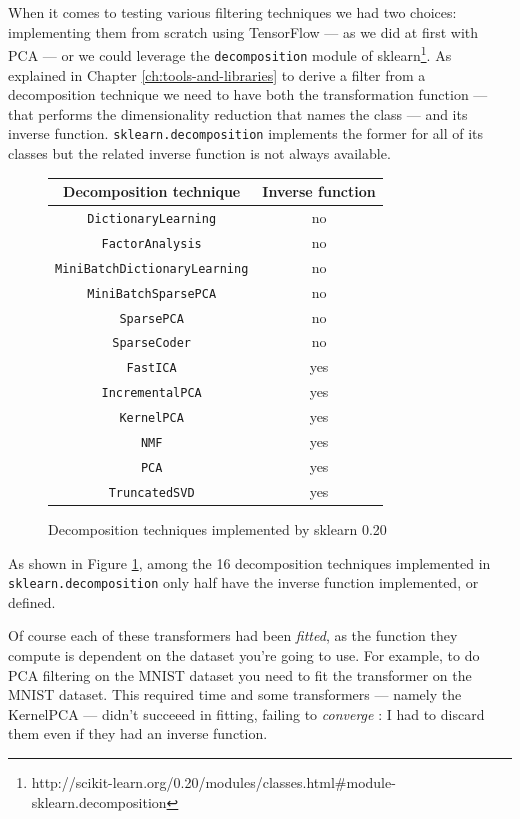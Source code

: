 When it comes to testing various filtering techniques we had two
choices: implementing them from scratch using TensorFlow --- as we did
at first with PCA --- or we could leverage the \texttt{decomposition}
module of
sklearn\footnote{http://scikit-learn.org/0.20/modules/classes.html\#module-sklearn.decomposition}.
As explained in Chapter \ref{ch:tools-and-libraries} to derive a filter
from a decomposition technique we need to have both the transformation
function --- that performs the dimensionality reduction that names the
class --- and its inverse function. \texttt{sklearn.decomposition}
implements the former for all of its classes but the related inverse
function is not always available.

\begin{figure}
  \centering
  \begin{tabular}{|c|c|}
    \hline
    Decomposition technique & Inverse function\\
    \hline
    \texttt{DictionaryLearning} & no \\
    \hline
    \texttt{FactorAnalysis} & no \\
    \hline
    \texttt{MiniBatchDictionaryLearning} & no \\
    \hline
    \texttt{MiniBatchSparsePCA} & no \\
    \hline
    \texttt{SparsePCA} & no \\
    \hline
    \texttt{SparseCoder} & no \\
    \hline
    \texttt{FastICA} & yes \\
    \hline
    \texttt{IncrementalPCA} & yes \\
    \hline
    \texttt{KernelPCA} & yes \\
    \hline
    \texttt{NMF} & yes \\
    \hline
    \texttt{PCA} & yes \\
    \hline
    \texttt{TruncatedSVD} & yes \\
    \hline
  \end{tabular}
  \caption{Decomposition techniques implemented by sklearn 0.20}
  \label{fig:decomposition-techniques}
\end{figure}

As shown in Figure \ref{fig:decomposition-techniques}, among the 16
decomposition techniques implemented in \texttt{sklearn.\-decomposition}
only half have the inverse function implemented, or defined.

Of course each of these transformers had been \emph{fitted}, as the
function they compute is dependent on the dataset you're going to use.
For example, to do PCA filtering on the MNIST dataset you need to fit
the transformer on the MNIST dataset. This required time and some
transformers --- namely the KernelPCA --- didn't succeeed in fitting,
failing to \emph{converge} : I had to discard them even if they had an
inverse function.

